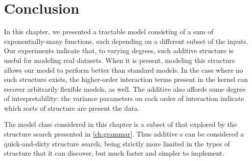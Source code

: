\section{Conclusion}

In this chapter, we presented a tractable \gp{} model consisting of a sum of exponentially-many functions, each depending on a different subset of the inputs.
Our experiments indicate that, to varying degrees, such additive structure is useful for modeling real datasets.
When it is present, modeling this structure allows our model to perform better than standard \gp{} models.
In the case where no such structure exists, the higher-order interaction terms present in the kernel can recover arbitrarily flexible models, as well.
The additive \gp{} also affords some degree of interpretability: the variance parameters on each order of interaction indicate which sorts of structure are present the data.

The model class considered in this chapter is a subset of that explored by the structure search presented in \cref{ch:grammar}.
Thus additive \gp{}s can be considered a quick-and-dirty structure search, being strictly more limited in the types of structure that it can discover, but much faster and simpler to implement.



\outbpdocument{


}





%
%





 
 

